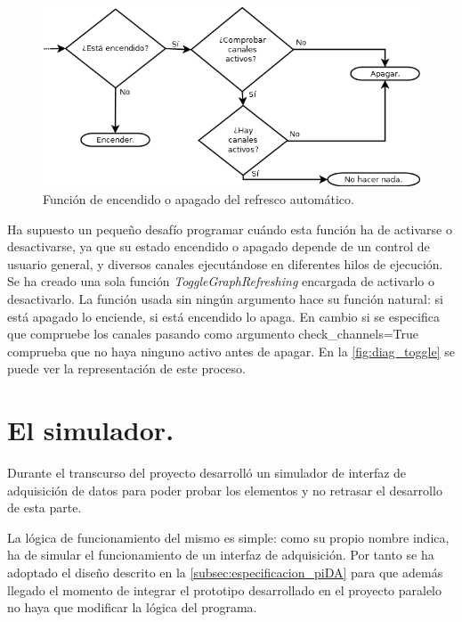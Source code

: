 				\begin{figure}[H]
			\centering
		  	\includegraphics[width=1\textwidth]{img/toggle_graph.png}
  			\caption[Función de encendido o apagado del refresco automático de la gráfica.]{Función de encendido o apagado del refresco automático.}\label{fig:diag_toggle}
		\end{figure}
		
		Ha supuesto un pequeño desafío programar cuándo esta función ha de activarse o desactivarse, ya que su estado encendido o apagado depende de un control de usuario general, y diversos canales ejecutándose en diferentes hilos de ejecución. Se ha creado una sola función \emph{ToggleGraphRefreshing} encargada de activarlo o desactivarlo. La función usada sin ningún argumento hace su función natural: si está apagado lo enciende, si está encendido lo apaga. En cambio si se especifica que compruebe los canales pasando como argumento check\_channels=True comprueba que no haya ninguno activo antes de apagar. En la \autoref{fig:diag_toggle} se puede ver la representación de este proceso.



	\section{El simulador.}\label{sec:sim}
	Durante el transcurso del proyecto desarrolló un simulador de interfaz de adquisición de datos para poder probar los elementos y no retrasar el desarrollo de esta parte. 
	
	La lógica de funcionamiento del mismo es simple: como su propio nombre indica, ha de simular el funcionamiento de un interfaz de adquisición. Por tanto se ha adoptado el diseño descrito en la \autoref{subsec:especificacion_piDA} para que además llegado el momento de integrar el prototipo desarrollado en el proyecto paralelo no haya que modificar la lógica del programa.
	
